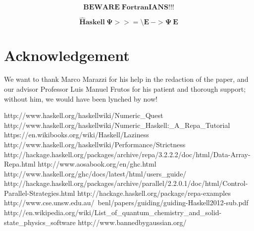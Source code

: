 \documentclass{tmr}
\begin{document}
\[\mathbf{BEWARE\;FortranIANS!!!} \]


\[\mathbf{\hat{H}askell\: \Psi >>= \setminus E\: -> \Psi\: E }\]

\section{Acknowledgement}

We want to thank Marco Marazzi for his help
in the redaction of the paper, and our advisor
Professor Luis Manuel Frutos for his patient
and thorough support; without
him, we would have been lynched by now!


\begin{thebibliography}{12}

  http://www.haskell.org/haskellwiki/Numeric\_Quest
 http://www.haskell.org/haskellwiki/Numeric\_Haskell:\_A\_Repa\_Tutorial
  https://en.wikibooks.org/wiki/Haskell/Laziness
  http://www.haskell.org/haskellwiki/Performance/Strictness
  http://hackage.haskell.org/packages/archive/repa/3.2.2.2/doc/html/Data-Array-Repa.html
  http://www.aosabook.org/en/ghc.html
  http://www.haskell.org/ghc/docs/latest/html/users\_guide/
  http://hackage.haskell.org/packages/archive/parallel/2.2.0.1/doc/html/Control-Parallel-Strategies.html
  http://hackage.haskell.org/package/repa-examples
  http://www.cse.unsw.edu.au/~benl/papers/guiding/guiding-Haskell2012-sub.pdf
  http://en.wikipedia.org/wiki/List\_of\_quantum\_chemistry\_and\_solid-state\_physics\_software
  http://www.bannedbygaussian.org/

\end{thebibliography}
\end{document}
